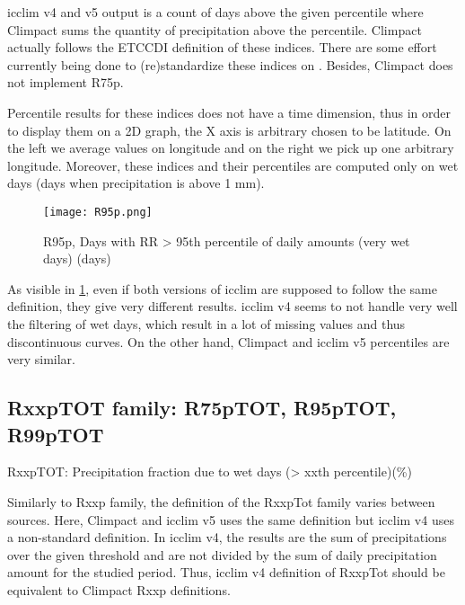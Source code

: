 \documentclass[a4paper,11pt]{article}
\begin{document}
            icclim v4 and v5 output is a count of days above the given percentile where Climpact sums the quantity of precipitation above the percentile. 
            Climpact actually follows the ETCCDI \cite{doc/etccdi} definition of these indices.
            There are some effort currently being done to (re)standardize these indices on \cite{gh/clixmeta}.
            Besides, Climpact does not implement R75p.

            Percentile results for these indices does not have a time dimension, thus in order to display them on a 2D graph, the X axis is arbitrary chosen to be latitude.
            On the left we average values on longitude and on the right we pick up one arbitrary longitude.
            Moreover, these indices and their percentiles are computed only on wet days (days when precipitation is above 1 mm).

            \begin{figure}
                \centering
                \texttt{[image: R95p.png]}
                \caption{R95p, Days with RR > 95th percentile of daily amounts (very wet days) (days)}
                \label{figure/r95p}
            \end{figure}

            As visible in \ref{figure/r95p}, even if both versions of icclim are supposed to follow the same definition, they give very different results.
            icclim v4 seems to not handle very well the filtering of wet days, which result in a lot of missing values and thus discontinuous curves.
            On the other hand, Climpact and icclim v5 percentiles are very similar.

        \subsection{RxxpTOT family: R75pTOT, R95pTOT, R99pTOT}
        RxxpTOT: Precipitation fraction due to wet days (> xxth percentile)(\%)

        Similarly to Rxxp family, the definition of the RxxpTot family varies between sources. 
        Here, Climpact and icclim v5 uses the same definition but icclim v4 uses a non-standard definition. 
        In icclim v4, the results are the sum of precipitations over the given threshold and are not divided by the sum of daily precipitation amount for the studied period. 
        Thus, icclim v4 definition of RxxpTot should be equivalent to Climpact Rxxp definitions.
\end{document}
